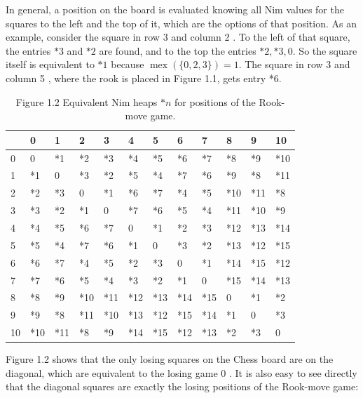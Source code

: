 \documentclass[12pt]{article}
\begin{document}
In general, a position on the board is evaluated knowing all Nim values for the squares to the left and the top of it, which are the options of that position. As an example, consider the square in row 3 and column 2 . To the left of that square, the entries $* 3$ and $* 2$ are found, and to the top the entries $* 2, * 3,0$. So the square itself is equivalent to $* 1$ because $\operatorname{mex}(\{0,2,3\})=1$. The square in row 3 and column 5 , where the rook is placed in Figure 1.1, gets entry *6.

\begin{table}[h]
\begin{center}
\begin{tabular}{|l|l|l|l|l|l|l|l|l|l|l|l|}
\hline
 & 0 & 1 & 2 & 3 & 4 & 5 & 6 & 7 & 8 & 9 & 10 \\
\hline
0 & 0 & *1 & *2 & *3 & *4 & *5 & *6 & *7 & *8 & *9 & *10 \\
\hline
1 & *1 & 0 & *3 & *2 & *5 & *4 & *7 & *6 & *9 & *8 & *11 \\
\hline
2 & *2 & *3 & 0 & *1 & *6 & *7 & *4 & *5 & *10 & *11 & *8 \\
\hline
3 & *3 & *2 & *1 & 0 & *7 & *6 & *5 & *4 & *11 & *10 & *9 \\
\hline
4 & *4 & *5 & *6 & *7 & 0 & *1 & *2 & *3 & *12 & *13 & *14 \\
\hline
5 & *5 & *4 & *7 & *6 & *1 & 0 & *3 & *2 & *13 & *12 & *15 \\
\hline
6 & *6 & *7 & *4 & *5 & *2 & *3 & 0 & *1 & *14 & *15 & *12 \\
\hline
7 & *7 & *6 & *5 & *4 & *3 & *2 & *1 & 0 & *15 & *14 & *13 \\
\hline
8 & *8 & *9 & *10 & *11 & *12 & *13 & *14 & *15 & 0 & *1 & *2 \\
\hline
9 & *9 & *8 & *11 & *10 & *13 & *12 & *15 & *14 & *1 & 0 & *3 \\
\hline
10 & *10 & *11 & *8 & *9 & *14 & *15 & *12 & *13 & *2 & *3 & 0 \\
\hline
\end{tabular}
\captionsetup{labelformat=empty}
\caption{Figure 1.2 Equivalent Nim heaps $* n$ for positions of the Rook-move game.}
\end{center}
\end{table}

Figure 1.2 shows that the only losing squares on the Chess board are on the diagonal, which are equivalent to the losing game 0 . It is also easy to see directly that the diagonal squares are exactly the losing positions of the Rook-move game:
\end{document}

